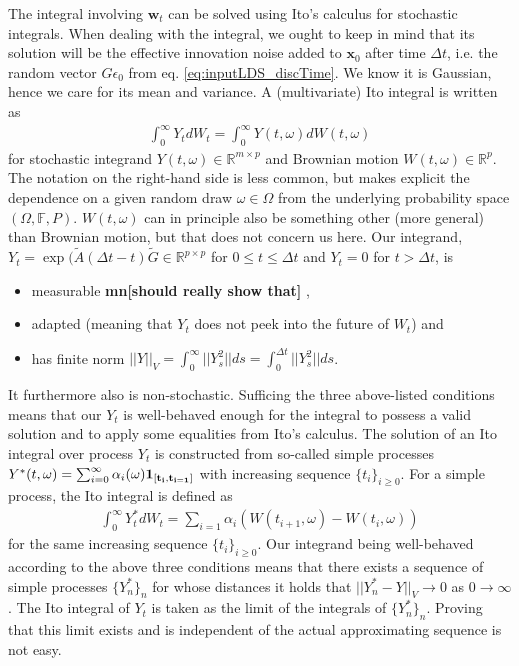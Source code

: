 \documentclass[10pt,letterpaper]{article}
\newcommand{\mn}[1]{   {\bf \color{blue}mn[#1]}  }
\newcommand{\xb}{\mathbf{x}}
\newcommand{\wb}{\mathbf{w}}
\begin{document}
\noindent{}The integral involving $\wb_t$ can be solved using Ito's calculus for stochastic integrals. When dealing with the integral, we ought to keep in mind that its solution will be the effective innovation noise added to $\xb_0$ after time $\Delta{}t$, i.e. the random vector $G\epsilon_0$ from eq. \ref{eq:inputLDS_discTime}. We know it is Gaussian, hence we care for its mean and variance. A (multivariate) Ito integral is written as 
\begin{align}
\int_0^\infty Y_t dW_t = \int_0^\infty Y(t,\omega) dW(t,\omega)
\end{align}
for stochastic integrand $Y(t,\omega) \in \mathbb{R}^{m \times p}$ and Brownian motion $W(t,\omega) \in \mathbb{R}^p$. The notation on the right-hand side is less common, but makes explicit the dependence on a given random draw $\omega \in \Omega$ from the underlying probability space $(\Omega, \mathbb{F}, P)$. $W(t, \omega)$ can in principle also be something other (more general) than Brownian motion, but that does not concern us here. Our integrand, $Y_t = \exp(\tilde{A}(\Delta{}t - t) \tilde{G} \in \mathbb{R}^{p \times p}$ for $0 \leq t \leq \Delta{t}$ and $Y_t = 0$ for $t > \Delta{}t$, is 
\begin{itemize}
\item measurable \mn{should really show that}, 
\item adapted (meaning that $Y_t$ does not peek into the future of $W_t$) and 
\item has finite norm $|| Y ||_V = \int_0^\infty || Y_s^2 || ds = \int_0^{\Delta{}t}|| Y_s^2 || ds$.
\end{itemize} 
It furthermore also is non-stochastic. Sufficing the three above-listed conditions means that our $Y_t$ is well-behaved enough for the integral to possess a valid solution and to apply some equalities from Ito's calculus. The solution of an Ito integral over process $Y_t$ is constructed from so-called simple processes $Y^*(t,\omega) = \sum_{i=0}^\infty \alpha_i(\omega) \bf{1}_{[t_i,t_{i=1}]}$ with increasing sequence $\{t_i\}_{i\geq0}$. For a simple process, the Ito integral is defined as 
\begin{align}
\int_0^\infty Y^*_t dW_t = \sum_{i=1} \alpha_i (W(t_{i+1},\omega) - W(t_{i},\omega))
\end{align}
for the same increasing sequence $\{t_i\}_{i\geq0}$. Our integrand being well-behaved according to the above three conditions means that there exists a sequence of simple processes $\{Y^*_n\}_n$ for whose distances it holds that $||Y^*_n - Y||_V \rightarrow 0$ as $0 \rightarrow \infty$. The Ito integral of $Y_t$ is taken as the limit of the integrals of $\{Y^*_n\}_n$. Proving that this limit exists and is independent of the actual approximating sequence is not easy. \\
\end{document}
